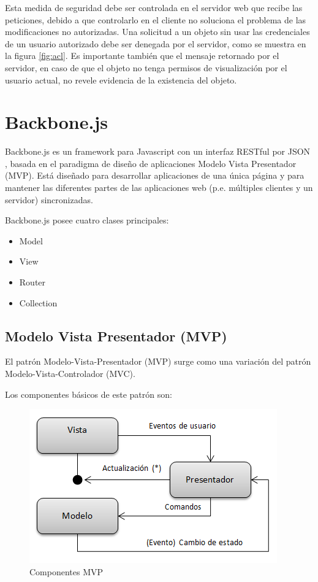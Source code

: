 Esta medida de seguridad debe ser controlada en el servidor web que recibe las peticiones, debido a que controlarlo en el cliente no soluciona el problema de las modificaciones no autorizadas. Una solicitud a un objeto sin usar las credenciales de un usuario autorizado debe ser denegada por el servidor, como se muestra en la figura \ref{fig:acl}. Es importante también que el mensaje retornado por el servidor, en caso de que el objeto no tenga permisos de visualización por el usuario actual, no revele evidencia de la existencia del objeto.

\section{Backbone.js}

Backbone.js es un \gls{framework} para Javascript con un interfaz RESTful por \gls{JSON} , basada en el paradigma de diseño de aplicaciones Modelo Vista Presentador (MVP).
Está diseñado para desarrollar aplicaciones de una única página y para mantener las diferentes partes de las aplicaciones web (p.e. múltiples clientes y un servidor) sincronizadas.

Backbone.js posee cuatro clases principales:

\begin{itemize}
    \item Model 
    \item View
    \item Router
    \item Collection
 \end{itemize}
 
 \subsection{Modelo Vista Presentador (MVP)}
 
 El patrón Modelo-Vista-Presentador (MVP) surge como una variación del patrón Modelo-Vista-Controlador (MVC).
 
 Los componentes básicos de este patrón son:
 
\begin{figure}[htbp]
  \centering
    \includegraphics{imagenes/MVP.png}
    
     \caption{Componentes MVP}
    \label{MVP}
\end{figure}

